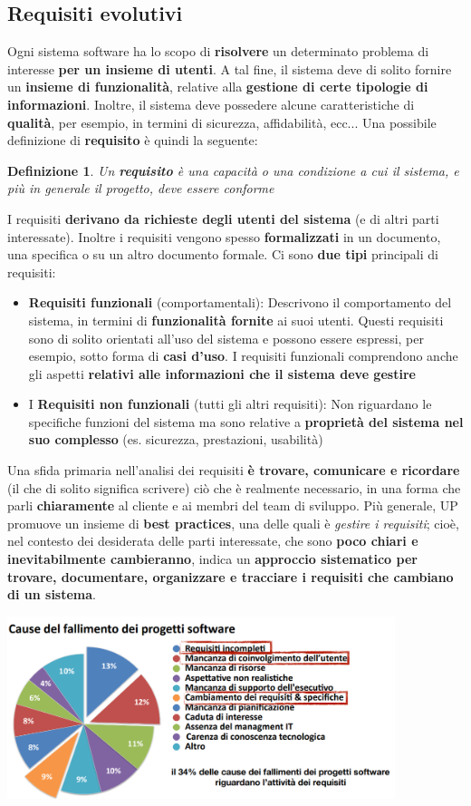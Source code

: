 \documentclass[12pt]{article}
\newtheorem{Definizione}{Definizione}[subsection]
\begin{document}
\subsection{Requisiti evolutivi}
Ogni sistema software ha lo scopo di \textbf{risolvere} un determinato problema di interesse \textbf{per un insieme di utenti}.
A tal fine, il sistema deve di solito fornire un \textbf{insieme di funzionalità}, relative alla \textbf{gestione di certe tipologie di informazioni}.
Inoltre, il sistema deve possedere alcune caratteristiche di \textbf{qualità}, per esempio, in termini di sicurezza, affidabilità, ecc... 
Una possibile definizione di \textbf{requisito} è quindi la seguente:
\begin{Definizione}
    Un \textbf{requisito} è una capacità o una condizione a cui il sistema, e più in generale il progetto, deve essere conforme
\end{Definizione}
I requisiti \textbf{derivano da richieste degli utenti del sistema} (e di altri parti interessate).
Inoltre i requisiti vengono spesso \textbf{formalizzati} in un documento, una specifica o su un altro documento formale.
Ci sono \textbf{due tipi} principali di requisiti:
\begin{itemize}
    \item \textbf{Requisiti funzionali} (comportamentali): Descrivono il comportamento del sistema, in termini di \textbf{funzionalità fornite} ai suoi utenti.
    Questi requisiti sono di solito orientati all'uso del sistema e possono essere espressi, per esempio, sotto forma di \textbf{casi d'uso}.
    I requisiti funzionali comprendono anche gli aspetti \textbf{relativi alle informazioni che il sistema deve gestire}
    \item I \textbf{Requisiti non funzionali} (tutti gli altri requisiti): Non riguardano le specifiche funzioni del sistema ma sono relative a \textbf{proprietà del sistema nel suo complesso}
    (es. sicurezza, prestazioni, usabilità) 
\end{itemize} 
Una sfida primaria nell'analisi dei requisiti \textbf{è trovare, comunicare e ricordare} (il che di solito significa scrivere) ciò che è realmente necessario, in una forma che parli \textbf{chiaramente} al cliente e ai membri del team di sviluppo.
Più generale, UP promuove un insieme di \textbf{best practices}, una delle quali è \textit{gestire i requisiti}; cioè, nel contesto dei desiderata delle parti interessate,  che sono \textbf{poco chiari e inevitabilmente cambieranno}, indica un \textbf{approccio sistematico per trovare, documentare, organizzare e tracciare i requisiti che cambiano di un sistema}.
\begin{center}
    \includegraphics[width = 0.85\textwidth]{Images/27.PNG}
\end{center}
\end{document}

